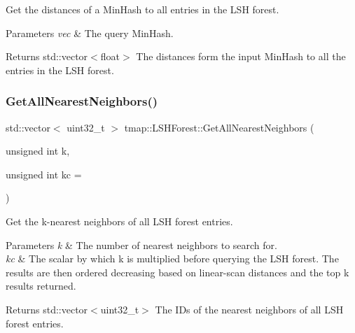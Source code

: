 Get the distances of a Min\+Hash to all entries in the L\+SH forest. 


\begin{DoxyParams}{Parameters}
{\em vec} & The query Min\+Hash. \\
\hline
\end{DoxyParams}
\begin{DoxyReturn}{Returns}
std\+::vector$<$float$>$ The distances form the input Min\+Hash to all the entries in the L\+SH forest. 
\end{DoxyReturn}
\mbox{\label{classtmap_1_1LSHForest_a5aad873dbf746403a5dd2962ca636f70}} 
\subsubsection{\texorpdfstring{Get\+All\+Nearest\+Neighbors()}{GetAllNearestNeighbors()}}
{\footnotesize\ttfamily std\+::vector$<$ uint32\+\_\+t $>$ tmap\+::\+L\+S\+H\+Forest\+::\+Get\+All\+Nearest\+Neighbors (\begin{DoxyParamCaption}\item[{unsigned int}]{k,  }\item[{unsigned int}]{kc = {} }\end{DoxyParamCaption})}



Get the k-\/nearest neighbors of all L\+SH forest entries. 


\begin{DoxyParams}{Parameters}
{\em k} & The number of nearest neighbors to search for. \\
\hline
{\em kc} & The scalar by which k is multiplied before querying the L\+SH forest. The results are then ordered decreasing based on linear-\/scan distances and the top k results returned. \\
\hline
\end{DoxyParams}
\begin{DoxyReturn}{Returns}
std\+::vector$<$uint32\+\_\+t$>$ The I\+Ds of the nearest neighbors of all L\+SH forest entries. 
\end{DoxyReturn}
\mbox{\label{classtmap_1_1LSHForest_ac4ec080057307f69548e6ca756ce5609}} 
